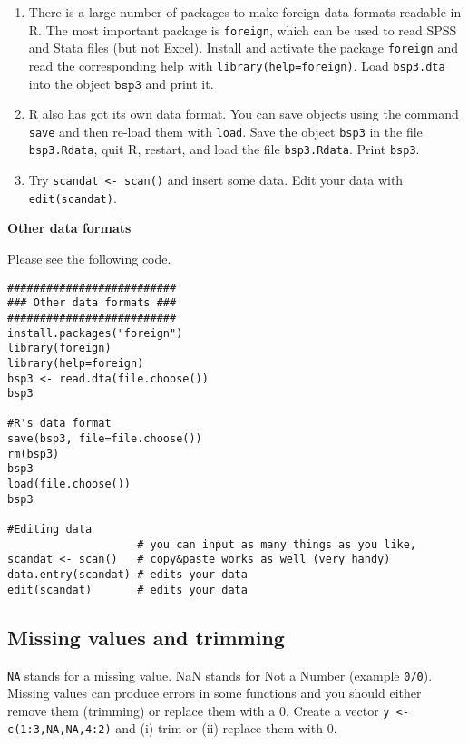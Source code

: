 \documentclass{article}
\begin{document}
\begin{enumerate}
\item There is a large number of packages to make foreign data formats readable in R. The most important package is \texttt{foreign}, which can be used to read SPSS and Stata files (but not Excel). Install and activate the package \texttt{foreign} and read the corresponding help with \texttt{library(help=foreign)}. Load \texttt{bsp3.dta} into the object $\mathtt{bsp3}$ and print it.

\item R also has got its own data format. You can save objects using the command \texttt{save} and then re-load them with \texttt{load}. Save the object \texttt{bsp3} in the file \texttt{bsp3.Rdata}, quit R, restart, and load the file \texttt{bsp3.Rdata}. Print \texttt{bsp3}.

\item Try \texttt{scandat <- scan()} and insert some data. Edit your data with \texttt{edit(scandat)}.
\end{enumerate}

\begin{solution}
\textbf{Other data formats}

Please see the following code.
\begin{verbatim}
##########################
### Other data formats ###
##########################
install.packages("foreign")
library(foreign)
library(help=foreign)
bsp3 <- read.dta(file.choose())
bsp3

#R's data format
save(bsp3, file=file.choose())
rm(bsp3)
bsp3
load(file.choose())
bsp3

#Editing data
                    # you can input as many things as you like,
scandat <- scan()   # copy&paste works as well (very handy)
data.entry(scandat) # edits your data
edit(scandat)       # edits your data
\end{verbatim}
\end{solution}

\subsection{Missing values and trimming}

\texttt{NA} stands for a missing value. NaN stands for Not a Number (example \texttt{0/0}). Missing values can produce errors in some functions and you should either remove them (trimming) or replace them with a 0. Create a vector \texttt{y <- c(1:3,NA,NA,4:2)} and (i) trim or (ii) replace them with 0.
\end{document}
